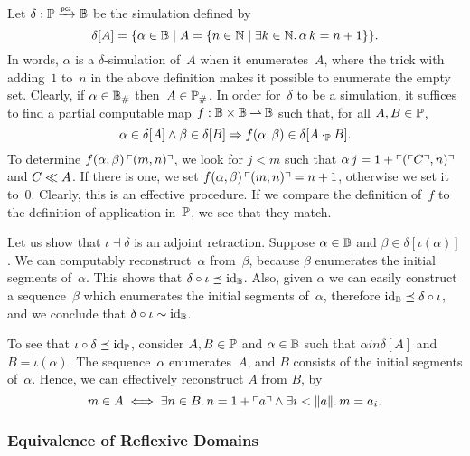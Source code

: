 Let $\delta: \Scott \pcato \Baire$ be the simulation defined by
%
\begin{equation*}
  \delta[A] =
  \set{ \alpha \in \Baire \such
        A = \set{n \in \NN \such \some{k \in \NN} \alpha\,k = n + 1}
  }.
\end{equation*}
%
In words, $\alpha$ is a $\delta$-simulation of~$A$ when it
enumerates~$A$, where the trick with adding~$1$ to~$n$ in the above definition makes it possible to enumerate the empty set. Clearly, if $\alpha \in \comp{\Baire}$
then~$A \in \comp{\Scott}$. In order for~$\delta$ to be a simulation, it suffices to find a partial computable map $f : \Baire \times \Baire \parto \Baire$ such that,
for all $A, B \in \Scott$,
% 
\begin{equation*}
  \alpha \in \delta[A] \land
  \beta \in \delta[B]
  \lthen
  f (\alpha, \beta) \in \delta[A \cdot_{\Scott} B].
\end{equation*}
% 
To determine $f (\alpha, \beta) \, \code{(m, n)}$, we look for $j < m$ such that $\alpha \, j = 1 + \code{(\code{C}, n)}$ and $C \wayb A$. If there is one, we set $f (\alpha, \beta) \, \code{(m, n)} = n + 1$, otherwise we set it to~$0$.
Clearly, this is an effective procedure. If we compare the definition of~$f$ to the definition of application in~$\Scott$, we see that they match.

Let us show that $\iota \dashv \delta$ is an adjoint retraction.
%
Suppose $\alpha \in \Baire$ and $\beta \in \delta[\iota(\alpha)]$.
%
We can computably reconstruct~$\alpha$ from~$\beta$, because $\beta$ enumerates the initial
segments of~$\alpha$. This shows that $\delta \circ \iota \preceq \id[\Baire]$. Also, given $\alpha$ we can easily
construct a sequence~$\beta$ which enumerates the initial segments of~$\alpha$, therefore
$\id[\Baire] \preceq \delta \circ \iota$, and we conclude that $\delta \circ \iota \sim \id[\Baire]$.

To see that $\iota \circ \delta \preceq \id[\Scott]$, consider $A, B \in \Scott$ and $\alpha \in \Baire$ such that $\alpha in \delta[A]$ and $B = \iota(\alpha)$. The sequence~$\alpha$ enumerates~$A$, and $B$ consists of the initial segments of~$\alpha$. Hence, we can effectively reconstruct $A$ from $B$, by
%
\begin{equation*}
  m \in A
  \iff
  \some{n \in B} n = 1 + \code{a} \land \some{i < \T{a}} m = a_i.
\end{equation*}


\subsubsection{Equivalence of Reflexive Domains}
\label{sec:equivalence_reflexive_domains}%

